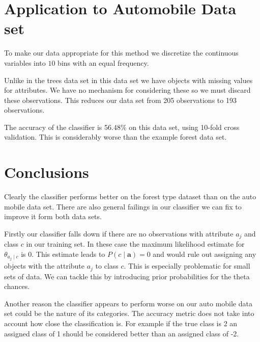 \section{Application to Automobile Data set}

To make our data appropriate for this method we discretize the continuous variables into $10$ bins with an equal frequency.

Unlike in the trees data set in this data set we have objects with missing values for attributes.
We have no mechanism for considering these so we must discard these observations.
This reduces our data set from 205 observations to 193 observations.

The accuracy of the classifier is 56.48\% on this data set, using 10-fold cross validation.
This is considerably worse than the example forest data set.

\section{Conclusions}

Clearly the classifier performs better on the forest type dataset than on the auto mobile data set.
There are also general failings in our classifier we can fix to improve it form both data sets.

Firstly our classifier falls down if there are no observations with attribute $a_j$ and class $c$ in our training set. In these case the maximum likelihood estimate for $\theta_{a_j \mid c}$ is $0$.
This estimate leads to $P(c \mid \mathbf{a}) = 0$ and would rule out assigning any objects with the attribute $a_j$ to class $c$.
This is especially problematic for small sets of data.
We can tackle this by introducing prior probabilities for the theta chances.

Another reason the classifier appears to perform worse on our auto mobile data set could be the nature of its categories.
The accuracy metric does not take into account how close the classification is.
For example if the true class is 2 an assigned class of 1 should be considered better than an assigned class of -2.


